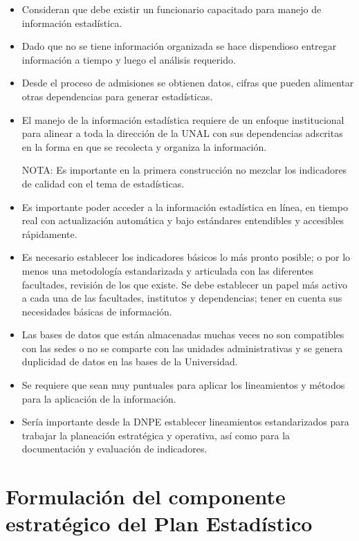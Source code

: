 \documentclass[
]{book}
\begin{document}
\begin{itemize}
\item
  Consideran que debe existir un funcionario capacitado
  para manejo de información estadística.
\item
  Dado que no se tiene información organizada se hace
  dispendioso entregar información a tiempo y luego el
  análisis requerido.
\item
  Desde el proceso de admisiones se obtienen datos,
  cifras que pueden alimentar otras dependencias para
  generar estadísticas.
\item
  El manejo de la información estadística requiere de
  un enfoque institucional para alinear a toda la
  dirección de la UNAL con sus dependencias adscritas en
  la forma en que se recolecta y organiza la
  información.

  NOTA: Es importante en la primera construcción no
  mezclar los indicadores de calidad con el tema de
  estadísticas.
\item
  Es importante poder acceder a la
  información estadística en línea, en tiempo real con
  actualización automática y bajo estándares
  entendibles y accesibles rápidamente.
\item
  Es necesario establecer los indicadores básicos lo
  más pronto posible; o por lo menos una metodología estandarizada y articulada
  con las diferentes facultades, revisión de los que existe. Se debe establecer un papel más activo a cada una de las facultades, institutos y dependencias; tener en cuenta sus necesidades básicas de información.
\item
  Las bases de datos que están almacenadas muchas veces
  no son compatibles con las sedes o no se comparte con
  las unidades administrativas y se genera duplicidad
  de datos en las bases de la Universidad.
\item
  Se requiere que sean muy puntuales para aplicar los
  lineamientos y métodos para la aplicación de la
  información.
\item
  Sería importante desde la DNPE establecer lineamientos
  estandarizados para trabajar la planeación
  estratégica y operativa, así como para la
  documentación y evaluación de indicadores.
\end{itemize}

\hypertarget{formulaciuxf3n-del-componente-estratuxe9gico-del-plan-estaduxedstico}{%
\chapter{Formulación del componente estratégico del Plan Estadístico}\label{formulaciuxf3n-del-componente-estratuxe9gico-del-plan-estaduxedstico}}
\end{document}
